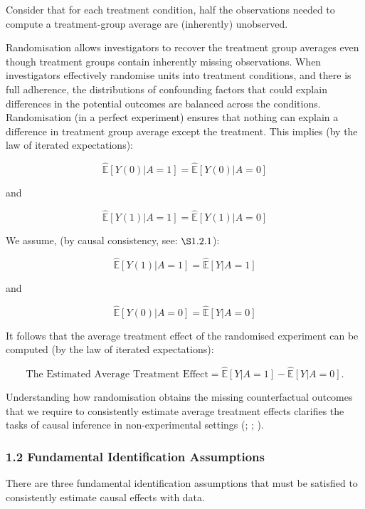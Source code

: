 \documentclass[
  singlecolumn]{article}
\begin{document}
Consider that for each treatment condition, half the observations needed
to compute a treatment-group average are (inherently) unobserved.

Randomisation allows investigators to recover the treatment group
averages even though treatment groups contain inherently missing
observations. When investigators effectively randomise units into
treatment conditions, and there is full adherence, the distributions of
confounding factors that could explain differences in the potential
outcomes are balanced across the conditions. Randomisation (in a perfect
experiment) ensures that nothing can explain a difference in treatment
group average except the treatment. This implies (by the law of iterated
expectations):

\[
\widehat{\mathbb{E}}[Y(0) | A = 1] = \widehat{\mathbb{E}}[Y(0) | A = 0]
\]

and

\[
\widehat{\mathbb{E}}[Y(1) | A = 1] = \widehat{\mathbb{E}}[Y(1) | A = 0]
\]

We assume, (by causal consistency, see: \(\S 1.2.1\)):

\[\widehat{\mathbb{E}}[Y(1) | A = 1] = \widehat{\mathbb{E}}[Y| A = 1]\]

and

\[\widehat{\mathbb{E}}[Y(0) | A = 0] = \widehat{\mathbb{E}}[Y| A = 0]\]

It follows that the average treatment effect of the randomised
experiment can be computed (by the law of iterated expectations):

\[
\text{The Estimated Average Treatment Effect} = \widehat{\mathbb{E}}[Y | A = 1] - \widehat{\mathbb{E}}[Y | A = 0].
\]

Understanding how randomisation obtains the missing counterfactual
outcomes that we require to consistently estimate average treatment
effects clarifies the tasks of causal inference in non-experimental
settings (;
;
).

\subsubsection{1.2 Fundamental Identification
Assumptions}\label{fundamental-identification-assumptions}

There are three fundamental identification assumptions that must be
satisfied to consistently estimate causal effects with data.
\end{document}
